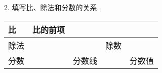 2. 填写比、除法和分数的关系.

\begin{center}

\begin{tabular}{|p{2.5cm}<{\centering}|p{2.5cm}<{\centering}|p{2.5cm}<{\centering}|p{2.5cm}<{\centering}|p{2.5cm}<{\centering}|}

     \hline

     比&比的前项&&& \\

     \hline

    除法&&&除数& \\

    \hline

    分数&&分数线&&分数值 \\

    \hline

\end{tabular}

\end{center}



